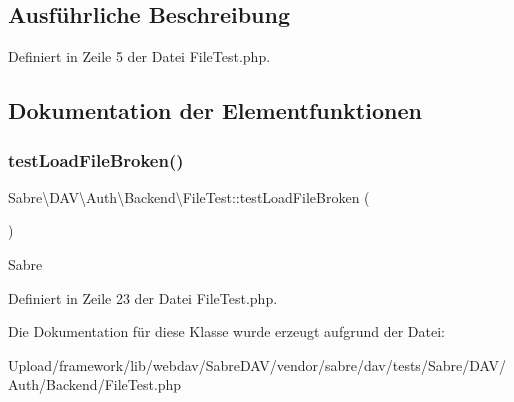 \subsection{Ausführliche Beschreibung}


Definiert in Zeile 5 der Datei File\+Test.\+php.



\subsection{Dokumentation der Elementfunktionen}
\mbox{\label{class_sabre_1_1_d_a_v_1_1_auth_1_1_backend_1_1_file_test_a9084db2414e88613ad9c428cc1b0b6ff}} 
\subsubsection{\texorpdfstring{test\+Load\+File\+Broken()}{testLoadFileBroken()}}
{\footnotesize\ttfamily Sabre\textbackslash{}\+D\+A\+V\textbackslash{}\+Auth\textbackslash{}\+Backend\textbackslash{}\+File\+Test\+::test\+Load\+File\+Broken (\begin{DoxyParamCaption}{ }\end{DoxyParamCaption})}

Sabre 

Definiert in Zeile 23 der Datei File\+Test.\+php.



Die Dokumentation für diese Klasse wurde erzeugt aufgrund der Datei\+:\begin{DoxyCompactItemize}
\item 
Upload/framework/lib/webdav/\+Sabre\+D\+A\+V/vendor/sabre/dav/tests/\+Sabre/\+D\+A\+V/\+Auth/\+Backend/File\+Test.\+php\end{DoxyCompactItemize}
